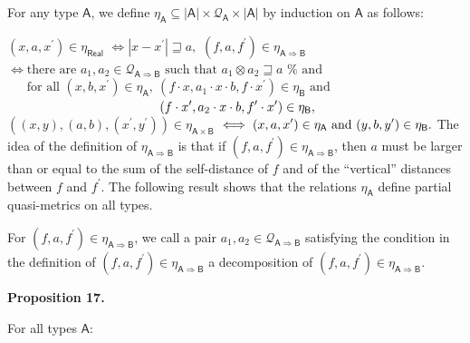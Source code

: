 \documentclass[10pt,a4paper]{amsart}
\begin{document}
 
 
For any type $\mathsf{A}$, we define $\eta_{\mathsf{A}}\subseteq|\mathsf{A}|\times\mathcal{Q}_{\mathsf{A}}\times|%
\mathsf{A}|$ by induction on $\mathsf{A}$ as follows:\par
    $\displaystyle(x,a,x^{\prime})\in\eta_{\mathsf{Real}}$ $\displaystyle\iff|x-x^{\prime}|\sqsupseteq a,$     $\displaystyle(f,a,f^{\prime})\in\eta_{\mathsf{A}\Rightarrow\mathsf{B}}$ $\displaystyle\iff\text{there are }a_{1},a_{2}\in\mathcal{Q}_{\mathsf{A}%
\Rightarrow\mathsf{B}}\text{ such that }a_{1}\otimes a_{2}\sqsupseteq a\text{ %
and }$      $\displaystyle\phantom{{}\iff{}}\text{for all }(x,b,x^{\prime})\in\eta_{\mathsf%
{A}},\ (f\cdot x,a_{1}\cdot x\cdot b,f\cdot x^{\prime})\in\eta_{\mathsf{B}}%
\text{ and }$      $\displaystyle\phantom{{}\iff{}\text{for all }(x,b,x^{\prime})\in\eta_{\mathsf{%
A}}\ }(f\cdot x^{\prime},a_{2}\cdot x\cdot b,f^{\prime}\cdot x^{\prime})\in%
\eta_{\mathsf{B}},$     $\displaystyle((x,y),(a,b),(x^{\prime},y^{\prime}))\in\eta_{\mathsf{A}\times%
\mathsf{B}}$ $\displaystyle\iff(x,a,x^{\prime})\in\eta_{\mathsf{A}}\text{ and }(y,b,y^{%
\prime})\in\eta_{\mathsf{B}}.$    
The idea of the definition of $\eta_{\mathsf{A}\Rightarrow\mathsf{B}}$ is that if $(f,a,f^{\prime})\in\eta_{\mathsf{A}\Rightarrow\mathsf{B}}$, then $a$ must be larger than or equal to the sum of the self-distance of $f$ and of the “vertical” distances between $f$ and $f^{\prime}$. The following result shows that the relations $\eta_{\mathsf{A}}$ define partial quasi-metrics on all types.\par
 
 
 
For $(f,a,f^{\prime})\in\eta_{\mathsf{A}\Rightarrow\mathsf{B}}$, we call a pair $a_{1},a_{2}\in\mathcal{Q}_{\mathsf{A}\Rightarrow\mathsf{B}}$ satisfying the condition in the definition of $(f,a,f^{\prime})\in\eta_{\mathsf{A}\Rightarrow\mathsf{B}}$ a decomposition of $(f,a,f^{\prime})\in\eta_{\mathsf{A}\Rightarrow\mathsf{B}}$.\par
 
 
 
\par\medskip\noindent\textbf{Proposition 17.}\par
 
 
For all types $\mathsf{A}$:\par
  
\end{document}

